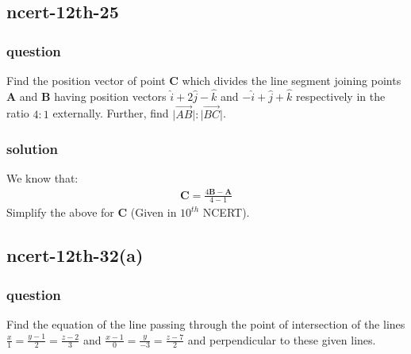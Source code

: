 \documentclass[journal,12pt,onecolumn]{IEEEtran}
\theoremstyle{remark}
\begin{document}
\subsection{ncert-12th-25}
\subsubsection{question}
Find the position vector of point $\textbf{C}$ which divides the line segment joining points $\textbf{A}$ and $\textbf{B}$ having position vectors $\hat{i} + 2\hat{j} - \hat{k}$ and $-\hat{i} + \hat{j} + \hat{k}$ respectively in the ratio $4:1$ externally. Further, find $\lvert \overrightarrow{AB}\rvert : \lvert \overrightarrow{BC} \rvert$. 
\subsubsection{solution}
We know that:
\begin{align}
\textbf{C} = \frac{4\textbf{B}-\textbf{A}}{4-1}
\end{align}
Simplify the above for \textbf{C} (Given in $10^{th}$ NCERT).


\subsection{ncert-12th-32(a)}
\subsubsection{question}
Find the equation of the line passing through the point of intersection of the lines $\frac{x}{1} = \frac{y-1}{2} = \frac{z-2}{3}$ and $\frac{x-1}{0} = \frac{y}{-3} = \frac{z-7}{2}$ and perpendicular to these given lines. 
\end{document}
